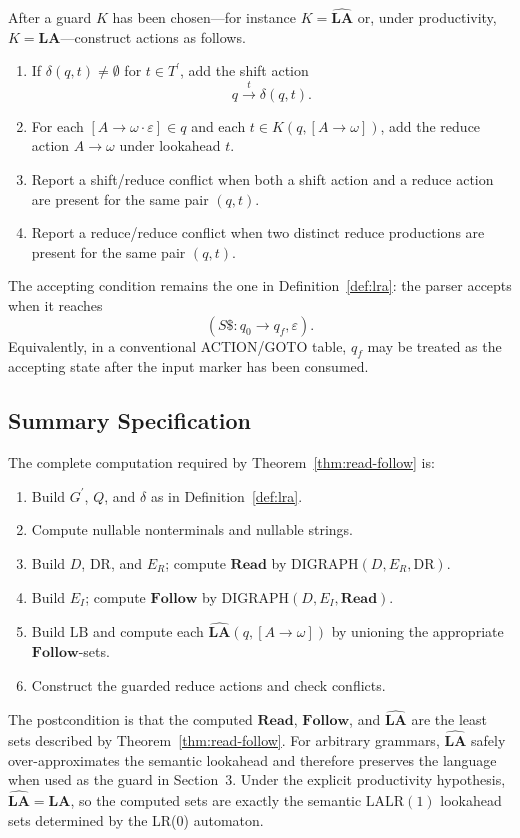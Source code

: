 \documentclass[11pt,a4paper]{article}
\theoremstyle{prettyplain}
\theoremstyle{prettydef}
\newcommand{\eps}{\varepsilon}
\newcommand{\LALRone}{\mathrm{LALR(1)}}
\newcommand{\Path}[3]{#1:#2\to#3}
\newcommand{\Item}[2]{[#1\to #2]}
\newcommand{\Look}{\mathbf{LA}}
\newcommand{\Read}{\mathbf{Read}}
\newcommand{\Follow}{\mathbf{Follow}}
\begin{document}
After a guard \(K\) has been chosen---for instance \(K=\widehat{\Look}\) or, under productivity, \(K=\Look\)---construct actions as follows.
\begin{enumerate}
\item If \(\delta(q,t)\ne\emptyset\) for \(t\in T^\prime\), add the shift action
\[
q\xrightarrow{t}\delta(q,t).
\]
\item For each \(\Item{A}{\omega\cdot\eps}\in q\) and each
\(t\in K(q,\Item{A}{\omega})\), add the reduce action \(A\to\omega\) under
lookahead \(t\).
\item Report a shift/reduce conflict when both a shift action and a reduce
action are present for the same pair \((q,t)\).
\item Report a reduce/reduce conflict when two distinct reduce productions are
present for the same pair \((q,t)\).
\end{enumerate}
The accepting condition remains the one in Definition~\ref{def:lra}: the parser
accepts when it reaches
\[
(\Path{S\$}{q_0}{q_f},\eps).
\]
Equivalently, in a conventional ACTION/GOTO table, \(q_f\) may be treated as the
accepting state after the input marker has been consumed.

\subsection{Summary Specification}

The complete computation required by Theorem~\ref{thm:read-follow} is:
\begin{enumerate}
\item Build \(G^\prime\), \(Q\), and \(\delta\) as in
Definition~\ref{def:lra}.
\item Compute nullable nonterminals and nullable strings.
\item Build \(D\), \(\mathrm{DR}\), and \(E_R\); compute \(\Read\) by
\(\mathrm{DIGRAPH}(D,E_R,\mathrm{DR})\).
\item Build \(E_I\); compute \(\Follow\) by
\(\mathrm{DIGRAPH}(D,E_I,\Read)\).
\item Build \(\mathrm{LB}\) and compute each
\(\widehat{\Look}(q,\Item{A}{\omega})\) by unioning the appropriate
\(\Follow\)-sets.
\item Construct the guarded reduce actions and check conflicts.
\end{enumerate}
The postcondition is that the computed \(\Read\), \(\Follow\), and \(\widehat{\Look}\) are
the least sets described by Theorem~\ref{thm:read-follow}.  For arbitrary
grammars, \(\widehat{\Look}\) safely over-approximates the semantic lookahead and
therefore preserves the language when used as the guard in Section~3.  Under the
explicit productivity hypothesis, \(\widehat{\Look}=\Look\), so the computed sets are
exactly the semantic \(\LALRone\) lookahead sets determined by the LR(0) automaton.
\end{document}
